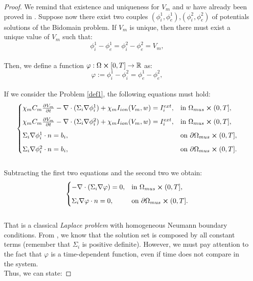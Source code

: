 \documentclass[a4paper,11pt]{article}
\begin{document}
\begin{proof}
	\vspace{2mm} We remind that existence and uniqueness for $V_m$ and $w$ have already been proved in \cite{bourgault}. 
	Suppose now there exist two couples $(\phi_i^1,\phi_e^1)$,$(\phi_i^2,\phi_e^2)$ of potentials solutions of the Bidomain problem. If $V_m$ is unique, then there must exist a unique value of $V_m$ such that:
	\begin{equation*}
	\phi_i^1-\phi_e^1 = \phi_i^2-\phi_e^2 = V_m,
	\end{equation*}\\
	Then, we define a function $\varphi:\Omega \cross [0,T] \rightarrow \mathbb{R}$ as:
	\begin{equation*}
	\varphi := \phi_i^1-\phi_i^2 = \phi_e^1-\phi_e^2,
	\end{equation*}\\
	If we consider the Problem \ref{def1}, the following equations must hold:
	\begin{equation*}
	\begin{cases}
	\chi_m C_m\pdv{V_m}{t} - \nabla \cdot (\Sigma_i \nabla \phi_i^1) + \chi_m I_{ion}(V_m,w) = I_i^{ext},    & \text{in } \Omega_{mus} \cross (0,T],\vspace{2mm}
	\\
	\chi_m C_m\pdv{V_m}{t} - \nabla \cdot (\Sigma_i \nabla \phi_i^2) + \chi_m I_{ion}(V_m,w) = I_i^{ext},    & \text{in } \Omega_{mus} \cross (0,T],\vspace{2mm}
	\\
	\Sigma_i\nabla \phi_i^1 \cdot n = b_i,   & \text{on } \partial \Omega_{mus} \cross (0,T],\vspace{2mm}
	\\
	\Sigma_i\nabla \phi_i^2 \cdot n = b_i,   & \text{on } \partial \Omega_{mus} \cross (0,T].
	\end{cases}
	\end{equation*}\\
	Subtracting the first two equations and the second two we obtain:
	\begin{equation*}
	\begin{cases}
	- \nabla \cdot (\Sigma_i \nabla \varphi) = 0,    & \text{in } \Omega_{mus} \cross (0,T],\vspace{2mm}
	\\
	\Sigma_i\nabla \varphi \cdot n = 0,   & \text{on } \partial \Omega_{mus} \cross (0,T].
	\end{cases}
	\end{equation*} \\
	That is a classical \emph{Laplace problem} with homogeneous Neumann boundary conditions. From \cite{salsa}, we know that the solution set is composed by all constant terms (remember that $\Sigma_i$ is positive definite). However, we must pay attention to the fact that $\varphi$ is a time-dependent function, even if time does not compare in the system. \\Thus, we can state:
	

\end{proof}
\end{document}
